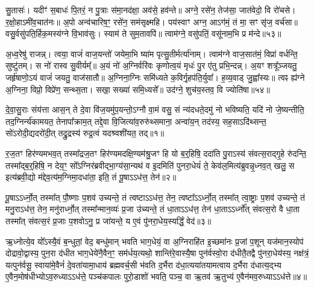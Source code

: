 सु॒तासः॑। यदीꣳ॑ स॒बाधः॑ पि॒तरं॒ न पु॒त्राः स॑मा॒नद॑क्षा॒ अव॑से॒ हव॑न्ते॥ अग्ने॒ रसे॑न॒ तेज॑सा॒ जात॑वेदो॒ वि रो॑चसे। र॒क्षो॒हा\-ऽमी॑व॒चात॑नः॥ अ॒पो अन्व॑चारिष॒ꣳ॒ रसे॑न॒ सम॑सृक्ष्महि। पय॑स्वाꣳ अग्न॒ आ\-ऽग॑मं॒ तं मा॒ सꣳ सृ॑ज॒ वर्च॑सा॥ वसु॒र्वसु॑पति॒र्\mbox{}हिक॒मस्य॑ग्ने वि॒भाव॑सुः। स्याम॑ ते सुम॒तावपि॑॥ त्वाम॑ग्ने॒ वसु॑पतिं॒ वसू॑नाम॒भि प्र म॑न्दे॥५३॥

अ॒ध्व॒रेषु॑ राजन्न्। त्वया॒ वाजं॑ वाज॒यन्तो॑ जयेमा॒भि ष्या॑म पृत्सु॒तीर्मर्त्या॑नाम्। त्वाम॑ग्ने वाज॒सात॑मं॒ विप्रा॑ वर्धन्ति॒ सुष्टु॑तम्। स नो॑ रास्व सु॒वीर्यम्᳚॥ अ॒यं नो॑ अ॒ग्निर्वरि॑वः कृणोत्व॒यं मृधः॑ पु॒र ए॑तु प्रभि॒न्दन्न्। अ॒यꣳ शत्रू᳚ञ्जयतु॒ जर्\mbox{}हृ॑षाणो॒\-ऽयं वाजं॑ जयतु॒ वाज॑सातौ॥ अ॒ग्निना॒ग्निः समि॑ध्यते क॒विर्गृ॒हप॑ति॒र्युवा᳚। ह॒व्य॒वाड् जु॒ह्वा᳚स्यः॥ त्वꣴ ह्य॑ग्ने अ॒ग्निना॒ विप्रो॒ विप्रे॑ण॒ सन्थ्स॒ता। सखा॒ सख्या॑ समि॒ध्यसे᳚॥ उद॑ग्ने॒ शुच॑य॒स्तव॒ वि ज्योति॑षा॥५४॥

{\anuvakamend[{म॒घवा॑नं मन्दे॒ ह्य॑ग्ने॒ चतु॑र्दश च॥46॥}]}

\setcounter{anuvakam}{0}
दे॒वा॒सु॒राः संय॑त्ता आस॒न् ते दे॒वा वि॑ज॒यमु॑प॒यन्तो॒\-ऽग्नौ वा॒मं वसु॒ सं न्य॑दधते॒दमु॑ नो भविष्यति॒ यदि॑ नो जे॒ष्यन्तीति॒ तद॒ग्निर्न्य॑कामयत॒ तेनापा᳚क्राम॒त् तद्दे॒वा वि॒जित्या॑व॒रुरु॑थ्समाना॒ अन्वा॑य॒न् तद॑स्य॒ सह॒सा\-ऽदि॑थ्सन्त॒ सो॑\-ऽरोदी॒द्यदरो॑दी॒त् तद्रु॒द्रस्य॑ रुद्र॒त्वं यदश्र्वशी॑यत॒ तद्॥१॥

र॒ज॒तꣳ हिर॑ण्यमभव॒त् तस्मा᳚द्रज॒तꣳ हिर॑ण्यमदक्षि॒ण्यम॑श्रु॒जꣳ हि यो ब॒र्॒\mbox{}हिषि॒ ददा॑ति पु॒रा\-ऽस्य॑ संवत्स॒राद्गृ॒हे रु॑दन्ति॒ तस्मा᳚द्ब॒र्॒\mbox{}हिषि॒ न देय॒ꣳ॒ सो᳚\-ऽग्निर॑ब्रवीद्भा॒ग्य॑सा॒न्यथ॑ व इ॒दमिति॑ पुनरा॒धेयं॑ ते॒ केव॑ल॒मित्य॑ब्रुवन्नृ॒ध्नव॒त् खलु॒ स इत्य॑ब्रवी॒द्यो म॑द्देव॒त्य॑म॒ग्निमा॒दधा॑ता॒ इति॒ तं पू॒षा\-ऽ\-ऽध॑त्त॒ तेन॑॥२॥

पू॒षा\-ऽ\-ऽर्ध्नो॒त् तस्मा᳚त् पौ॒ष्णाः प॒शव॑ उच्यन्ते॒ तं त्वष्टा\-ऽ\-ऽध॑त्त॒ तेन॒ त्वष्टा᳚\-ऽ\-ऽर्ध्नो॒त् तस्मा᳚त् त्वा॒ष्ट्राः प॒शव॑ उच्यन्ते॒ तं मनु॒रा\-ऽध॑त्त॒ तेन॒ मनु॑रार्ध्नो॒त् तस्मा᳚न्मान॒व्यः॑ प्र॒जा उ॑च्यन्ते॒ तं धा॒ता\-ऽ\-ऽध॑त्त॒ तेन॑ धा॒ता\-ऽ\-ऽर्ध्नो᳚त् संवत्स॒रो वै धा॒ता तस्मा᳚त् संवत्स॒रं प्र॒जाः प॒शवो\-ऽनु॒ प्र जा॑यन्ते॒ य ए॒वं पु॑नरा॒धेय॒स्यर्द्धिं॒ वेद॑॥३॥

ऋ॒ध्नोत्ये॒व यो᳚\-ऽस्यै॒वं ब॒न्धुतां॒ वेद॒ बन्धु॑मान् भवति भाग॒धेयं॒ वा अ॒ग्निराहि॑त इ॒च्छमा॑नः प्र॒जां प॒शून् यज॑मान॒स्योप॑ दोद्रावो॒द्वास्य॒ पुन॒रा द॑धीत भाग॒धेये॑नै॒वैन॒ꣳ॒ सम॑र्धय॒त्यथो॒ शान्ति॑रे॒वास्यै॒षा पुन॑र्वस्वो॒रा द॑धीतै॒तद्वै पु॑नरा॒धेय॑स्य॒ नक्ष॑त्रं॒ यत्पुन॑र्वसू॒ स्वाया॑मे॒वैनं॑ दे॒वता॑यामा॒धाय॑ ब्रह्मवर्च॒सी भ॑वति द॒र्भैरा द॑धा॒त्यया॑तयामत्वाय द॒र्भैरा द॑धात्य॒द्भ्य ए॒वैन॒मोष॑धीभ्यो\-ऽव॒रुध्या\-ऽ\-ऽध॑त्ते॒ पञ्च॑कपालः पुरो॒डाशो॑ भवति॒ पञ्च॒ वा ऋ॒तव॑ ऋ॒तुभ्य॑ ए॒वैन॑मव॒रुध्या\-ऽ\-ऽध॑त्ते॥४॥

